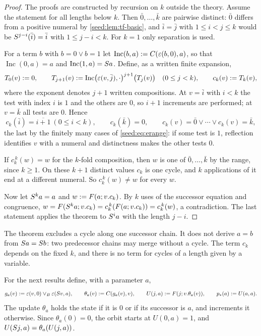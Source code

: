 \begin{proof}
The proofs are constructed by recursion on $k$ outside the theory. Assume
the statement for all lengths below $k$. Then $\bar0,\ldots,\bar k$ are
pairwise distinct: $\bar0$ differs from a positive numeral by
\cref{seed:lem:tf-basic}, and $\bar i=\bar j$ with $1\leq i<j\leq k$ would
be $S^{j-i}(\bar i)=\bar i$ with $1\leq j-i<k$. For $k=1$ only separation
is used.

For a term $b$ with $b=0\lor b=1$ let
$\operatorname{Inc}(b,a)\mathrel{:=} C(\varepsilon(b,0),a)$, so that
$\operatorname{Inc}(0,a)=a$ and $\operatorname{Inc}(1,a)=S a$. Define, as
a written finite expansion,
\[
 T_0(v)\mathrel{:=}0,\qquad
 T_{j+1}(v)\mathrel{:=}\operatorname{Inc}\bigl(\varepsilon(v,\bar j),\cdot\bigr)^{j+1}
 \bigl(T_j(v)\bigr)\quad(0\leq j<k),\qquad c_k(v)\mathrel{:=} T_k(v),
\]
where the exponent denotes $j+1$ written compositions. At $v=\bar i$ with
$i<k$ the test with index $i$ is $1$ and the others are $0$, so $i+1$
increments are performed; at $v=\bar k$ all tests are $0$. Hence
\[
 c_k(\bar i)=\overline{i+1}\ (0\leq i<k),\qquad c_k(\bar k)=0,\qquad
 c_k(v)=\bar0\lor\cdots\lor c_k(v)=\bar k,
\]
the last by the finitely many cases of \eqref{seed:eq:erange}: if some test
is $1$, reflection identifies $v$ with a numeral and distinctness makes the
other tests $0$.

If $c_k^{\,k}(w)=w$ for the $k$-fold composition, then $w$ is one of
$\bar0,\ldots,\bar k$ by the range, since $k\geq1$. On these $k+1$ distinct
values $c_k$ is one cycle, and $k$ applications of it end at a different
numeral. So $c_k^{\,k}(w)\neq w$ for every $w$.

Now let $S^ka=a$ and $w\mathrel{:=} F(a;v.c_k)$. By $k$ uses of the successor
equation and congruence,
$w=F(S^ka;v.c_k)=c_k^{\,k}(F(a;v.c_k))=c_k^{\,k}(w)$, a contradiction.
The last statement applies the theorem to $S^ia$ with the length $j-i$.
\end{proof}

The theorem excludes a cycle along one successor chain. It does not derive
$a=b$ from $S a=S b$: two predecessor chains may merge without a
cycle. The term $c_k$ depends on the fixed $k$, and there is no term for
cycles of a length given by a variable.

For the next results define, with a parameter $a$,
\[
 g_a(v)\mathrel{:=}\varepsilon(v,0)\lor_B\varepsilon(S v,a),\qquad
 \theta_a(v)\mathrel{:=} C(g_a(v),v),\qquad
 U(j,a)\mathrel{:=} F(j;v.\theta_a(v)),\qquad p_*(a)\mathrel{:=} U(a,a).
\]
The update $\theta_a$ holds the state if it is $0$ or if its successor is
$a$, and increments it otherwise. Since $\theta_a(0)=0$, the orbit starts at
$U(0,a)=1$, and $U(S j,a)=\theta_a(U(j,a))$.

